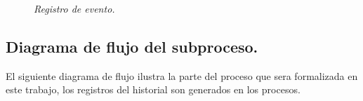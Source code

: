 \documentclass[12pt,a4paper]{article}
\begin{document}
\begin{figure}[h]
\centering
{}
\caption{\textit{Registro de evento.}} \label{fig:M1}
\end{figure}

\subsection{Diagrama de flujo del subproceso.}
El siguiente diagrama de flujo ilustra la parte del proceso que sera formalizada en este trabajo, los registros del historial son generados en los procesos.
\end{document}
